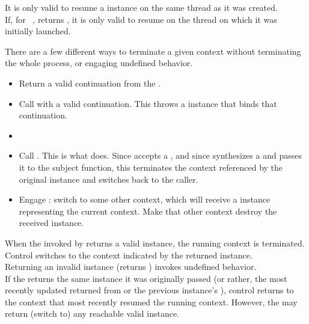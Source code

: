 It is only valid to resume a \cont instance on the same thread as it was created.\\

If, for \cont\ ,  returns , it is
only valid to resume  on the thread on which it was initially
launched.


There are a few different ways to terminate a given context without
terminating the whole process, or engaging undefined behavior.

\begin{itemize}
\item Return a valid continuation from the \entryfn.
\item Call \unwindcont with a valid continuation. This throws a \unwindex
instance that binds that continuation.
\item {}
\item
Call .
This is what \dtor does. Since \unwindcont accepts a \cont, and
since \resumewith synthesizes a \cont and passes it to the subject function,
this terminates the context referenced by the original \cont instance and
switches back to the caller.
\item Engage \dtor: switch to some other context, which will
receive a \cont instance representing the current context. Make that other
context destroy the received \cont instance.
\end{itemize}

When the \entryfn invoked by \callcc returns a valid \cont instance,
the running context is terminated. Control switches to the context
indicated by the returned \cont instance.\\

Returning an invalid \cont instance (\opbool returns ) invokes
undefined behavior.\\

If the \entryfn returns the same \cont instance it was originally
passed (or rather, the most recently updated \cont returned from \callcc or the
previous instance's \resume), control returns to the context that most
recently resumed the running context. However, the \entryfn may return (switch
to) any reachable valid \cont instance.\\

